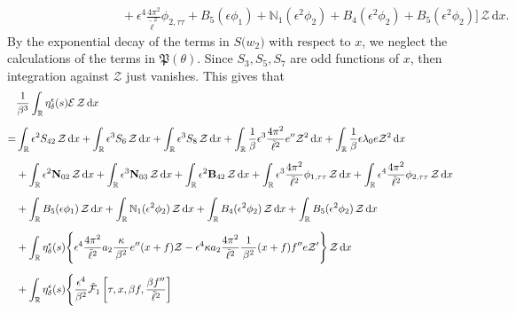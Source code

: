 \documentclass[10pt, reqno]{amsart}
\numberwithin{equation}{section}
\theoremstyle{definition}
\begin{document}
{\begin{align*}
\nonumber\\[2mm]
&\qquad \qquad \qquad \qquad
+ \epsilon^4 \frac{4\pi^2}{{\tilde\ell}^2}\phi_{2, \tau\tau}
 +B_{5}(\epsilon\phi_1) + \mathbb{N}_1 (\epsilon^2 \phi_2)
+ B_4(\epsilon^2\phi_2)+ B_5 (\epsilon^2{\phi_2}) \Bigg] \,{\mathcal Z} \,{\mathrm d}x.
\end{align*}
By the exponential decay of the terms in $S\big(w_2\big)$ with respect to $x$,
 we neglect the calculations of the terms in $ \mathfrak P(\theta). $ Since $S_{3}, S_5, S_7$ are odd functions of $x$, then integration against $\mathcal Z$ just vanishes.
This gives that
\begin{align}\label{projected eqs for enew}
& \frac{1}{\beta^3}\int_{\mathbb R}\eta_\delta^\epsilon(s){\mathcal E}\,{\mathcal Z} \,{\mathrm d}x
\nonumber\\[2mm]
=&
 \int_{\mathbb R} \epsilon^2 S_{42} \,{\mathcal Z} \,{\mathrm d}x
+\int_{\mathbb R} \epsilon^3 S_{6}\,{\mathcal Z} \,{\mathrm d}x
 +\int_{\mathbb R} \epsilon^3 S_{8}\,{\mathcal Z} \,{\mathrm d}x
 +\int_{\mathbb R} \frac 1\beta\epsilon^3\frac{4\pi^2}{{\tilde\ell}^2} e''\mathcal Z^2 \,{\mathrm d}x
 +\int_{\mathbb R} \frac 1\beta \epsilon\lambda_0 e{\mathcal Z}^2 \,{\mathrm d}x
\nonumber\\[2mm]
& +\int_{\mathbb R} \epsilon^2 {\bf N}_{02}\,{\mathcal Z} \,{\mathrm d}x
+\int_{\mathbb R} \epsilon^3 {\bf N}_{03}\,{\mathcal Z} \,{\mathrm d}x
+ \int_{\mathbb R} \epsilon^2 {\bf B}_{42}\,{\mathcal Z} \,{\mathrm d}x
+\int_{\mathbb R}  \epsilon^3 \frac{4\pi^2}{{\tilde\ell}^2} {\phi}_{1, \tau\tau}\,{\mathcal Z} \,{\mathrm d}x
+\int_{\mathbb R} \epsilon^4 \frac{4\pi^2}{{\tilde\ell}^2}\phi_{2, \tau\tau}\,{\mathcal Z} \,{\mathrm d}x
\nonumber\\[2mm]
&
+\int_{\mathbb R} B_{5}(\epsilon\phi_1) \,{\mathcal Z} \,{\mathrm d}x
+\int_{\mathbb R} \mathbb{N}_1 (\epsilon^2 \phi_2)\,{\mathcal Z} \,{\mathrm d}x
+\int_{\mathbb R} B_4(\epsilon^2\phi_2)\,{\mathcal Z} \,{\mathrm d}x
+\int_{\mathbb R} B_5 (\epsilon^2{\phi_2})\,{\mathcal Z} \,{\mathrm d}x
\nonumber\\[2mm]
&
 +\int_{\mathbb R} \eta_\delta^\epsilon(s) \Bigg\{ \epsilon^4 \frac{4\pi^2} {{\tilde\ell}^2} a_2\frac{\kappa}{\, \beta^2\, } e'' (x+f)\mathcal Z -\epsilon^4 \kappa a_2 \frac{ 4\pi^2} {{\tilde\ell}^2} \frac{1}{\, \beta^2\, } (x+f) f'' e \mathcal Z'  \Bigg\} \,{\mathcal Z} \,{\mathrm d}x
 \nonumber\\[2mm]
&
 +\int_{\mathbb R} \eta_\delta^\epsilon(s) \Bigg\{  \frac{\epsilon^4}{\beta^2} \hat{\mathcal F}_1\left[\tau, x, \beta f, \frac{\beta f''}{\tilde\ell^2} \right]

\end{align}}
\end{document}
